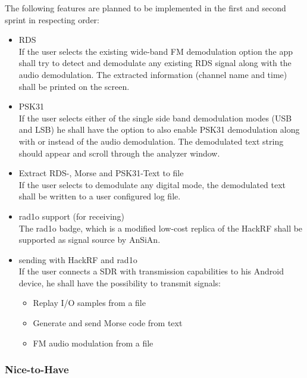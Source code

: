 The following features are planned to be implemented in the first and second
sprint in respecting order:
\begin{itemize}
	\item \ac{RDS} \\
		If the user selects the existing wide-band \ac{FM} demodulation option
		the app shall try to detect and demodulate any existing \ac{RDS}
		signal along with the audio demodulation. The extracted information
		(channel name and time) shall be printed on the screen.
	\item PSK31 \\
		If the user selects either of the single side band demodulation modes
		(\ac{USB} and \ac{LSB}) he shall have the option to also enable
		PSK31 demodulation along with or instead of the audio demodulation.
		The demodulated text string should appear and scroll through the
		analyzer window.
	\item Extract RDS-, Morse and PSK31-Text to file \\
		If the user selects to demodulate any digital mode, the demodulated
		text shall be written to a user configured log file.
	\item rad1o support (for receiving) \\
		The rad1o badge, which is a modified low-cost replica of the HackRF
		shall be supported as signal source by AnSiAn.
	\item sending with HackRF and rad1o \\
		If the user connects a \ac{SDR} with transmission capabilities to
		his Android device, he shall have the possibility to transmit signals:
		\begin{itemize}
			\item Replay I/O samples from a file
			\item Generate and send Morse code from text
			\item FM audio modulation from a file
		\end{itemize}
\end{itemize}

\subsubsection{Nice-to-Have}

